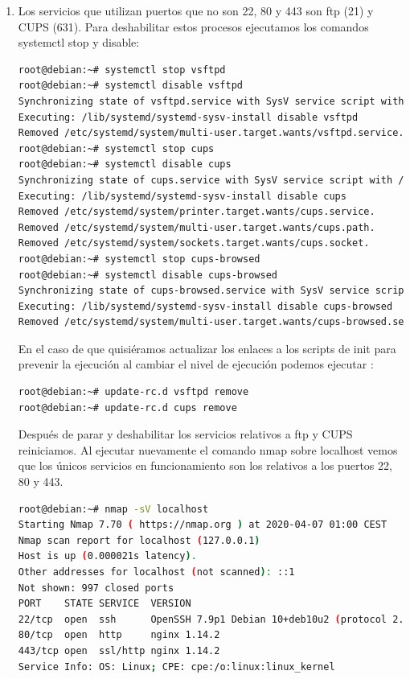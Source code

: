 \documentclass[10pt,a4paper]{article}
\begin{document}
\begin{enumerate}[label=\textbf{\alph*)}]
\item Los servicios que utilizan puertos que no son 22, 80 y 443 son ftp (21) y CUPS (631). Para deshabilitar estos procesos ejecutamos los comandos systemctl stop y disable:
\begin{lstlisting}[language=bash]
root@debian:~# systemctl stop vsftpd
root@debian:~# systemctl disable vsftpd
Synchronizing state of vsftpd.service with SysV service script with /lib/systemd/systemd-sysv-install.
Executing: /lib/systemd/systemd-sysv-install disable vsftpd
Removed /etc/systemd/system/multi-user.target.wants/vsftpd.service.
root@debian:~# systemctl stop cups
root@debian:~# systemctl disable cups
Synchronizing state of cups.service with SysV service script with /lib/systemd/systemd-sysv-install.
Executing: /lib/systemd/systemd-sysv-install disable cups
Removed /etc/systemd/system/printer.target.wants/cups.service.
Removed /etc/systemd/system/multi-user.target.wants/cups.path.
Removed /etc/systemd/system/sockets.target.wants/cups.socket.
root@debian:~# systemctl stop cups-browsed
root@debian:~# systemctl disable cups-browsed
Synchronizing state of cups-browsed.service with SysV service script with /lib/systemd/systemd-sysv-install.
Executing: /lib/systemd/systemd-sysv-install disable cups-browsed
Removed /etc/systemd/system/multi-user.target.wants/cups-browsed.service.
\end{lstlisting}

En el caso de que quisiéramos actualizar los enlaces a los scripts de init para prevenir la ejecución al cambiar el nivel de ejecución podemos ejecutar \cite{update-rc}:
\begin{lstlisting}[language=bash]
root@debian:~# update-rc.d vsftpd remove
root@debian:~# update-rc.d cups remove
\end{lstlisting}

Después de parar y deshabilitar los servicios relativos a ftp y CUPS reiniciamos. Al ejecutar nuevamente el comando nmap sobre localhost vemos que los únicos servicios en funcionamiento son los relativos a los puertos 22, 80 y 443.

\begin{lstlisting}[language=bash]
root@debian:~# nmap -sV localhost
Starting Nmap 7.70 ( https://nmap.org ) at 2020-04-07 01:00 CEST
Nmap scan report for localhost (127.0.0.1)
Host is up (0.000021s latency).
Other addresses for localhost (not scanned): ::1
Not shown: 997 closed ports
PORT    STATE SERVICE  VERSION
22/tcp  open  ssh      OpenSSH 7.9p1 Debian 10+deb10u2 (protocol 2.0)
80/tcp  open  http     nginx 1.14.2
443/tcp open  ssl/http nginx 1.14.2
Service Info: OS: Linux; CPE: cpe:/o:linux:linux_kernel


\end{lstlisting}
\end{enumerate}
\end{document}

